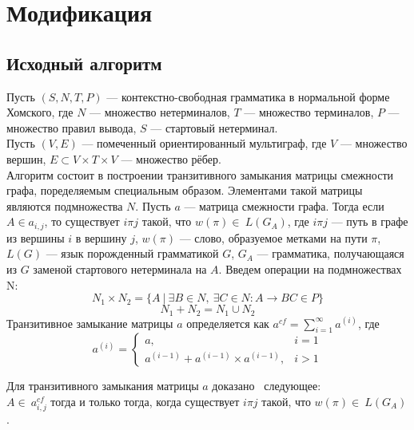 \documentclass[14pt]{matmex-diploma}
\theoremstyle{definition}
\begin{document}
\section{Модификация}
    \subsection{Исходный алгоритм}
        Пусть $(S, N,T,P)$ --- контекстно-свободная грамматика в нормальной форме Хомского, где $N$ --- множество нетерминалов, $T$ --- множество терминалов, $P$ --- множество правил вывода, $S$ --- стартовый нетерминал.\\
        Пусть $(V,E)$ --- помеченный ориентированный мультиграф, где $V$ --- множество вершин, $E \subset V \times T \times V$ --- множество рёбер.\\
        Алгоритм состоит в построении транзитивного замыкания матрицы смежности графа, поределяемым специальным образом.
        Элементами такой матрицы являются подмножества $N$. Пусть $a$ --- матрица смежности графа. Тогда если $A\in a_{i,j}$, то существует $i\pi j$ такой, что $w(\pi)\in~L(G_A)$, где $i\pi j$ --- путь в графе из вершины $i$ в вершину $j$, $w(\pi)$ --- слово, образуемое метками на пути $\pi$, $L(G)$ --- язык порожденный грамматикой $G$, $G_A$ --- грамматика, получающаяся из $G$ заменой стартового нетерминала на $A$.
        Введем операции на подмножествах N:
        \begin{equation*}
            N_1 \times N_2 = \{A~|~\exists B \in N,~\exists C \in N : A \rightarrow BC \in P\}
        \end{equation*}
        \begin{equation*}
            N_1 + N_2 = N_1 \cup N_2
        \end{equation*}
        Транзитивное замыкание матрицы $a$ определяется как $a^{cf} = \sum\limits_{i=1}^\infty a^{(i)}$, 
        где 
        \begin{equation*}
            a^{(i)} = 
            \begin{cases} 
                a,                                     & i=1\\
                a^{(i-1)} + a^{(i-1)}\times a^{(i-1)}, & i>1
            \end{cases}
        \end{equation*}

        
        Для транзитивного замыкания матрицы $a$ доказано~\cite{DBLP:journals/corr/AzimovG17} следующее:\\
        $A\in~a^{cf}_{i,j}$ тогда и только тогда, когда существует $i\pi j$ такой, что $w(\pi)\in~L(G_A)$.
        
\end{document}

